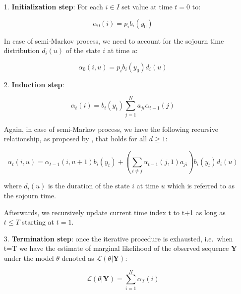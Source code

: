 \begin{itemize}
    \item[1.] \textbf{Initialization step}: For each $i \in I$ set value at time $t=0$ to:
    
    \begin{equation}
        \alpha_0(i)= p_i b_i(y_0)
    \end{equation}

    In case of semi-Markov process, we need to account for the sojourn time distribution $d_i(u)$ of the state $i$ at time $u$:

    \begin{equation}
        \alpha_0(i,u) = p_i b_i(y_0) d_i(u)
    \end{equation}

    \item[2.] \textbf{Induction step}: 
    
    \begin{equation}
        \alpha_t(i) = b_i(y_t) \sum\limits_{j=1}^N a_{ji} \alpha_{t-1}(j)
    \end{equation}

    Again, in case of semi-Markov process, we have the following recursive relationship, as proposed by \citep{Oliver2013}, that holds for all $d \geq 1$:

    \begin{equation}
        \alpha_t(i,u) = \alpha_{t-1}(i,u+1) b_i(y_t) + \left( \sum\limits_{i \neq j} \alpha_{t-1}(j,1) a_{ji} \right) b_i(y_t) d_i(u)
    \end{equation}

    where $d_i(u)$ is the duration of the state $i$ at time $u$ which is referred to as the sojourn time. 
    
    Afterwards, we recursively update current time index t to t+1 as long as $t \leq T$ starting at $t=1$.
    
    \item[3.] \textbf{Termination step}: once the iterative procedure is exhausted, i.e.\ when t=T we have the estimate of marginal likelihood of the observed sequence $\textbf{Y}$ under the model $\theta$ denoted as
    $\mathcal{L}(\theta| \textbf{Y})$:
    
    \begin{equation} \label{eq:loglikeF}
        \mathcal{L}(\theta| \textbf{Y}) = \sum_{i=1}^N \alpha_T(i)
    \end{equation}
    
    \end{itemize}

